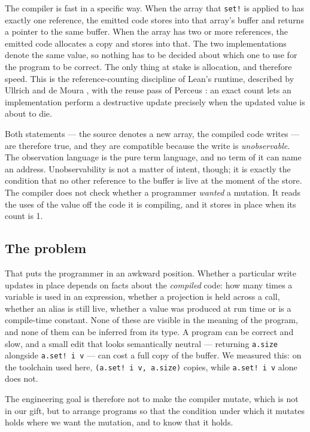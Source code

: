 \documentclass[11pt,a4paper]{article}
\theoremstyle{definition}
\theoremstyle{plain}
\newcommand{\code}[1]{\texttt{#1}}
\begin{document}
The compiler is fast in a specific way. When the array that \code{set!} is
applied to has exactly one reference, the emitted code stores into that array's
buffer and returns a pointer to the same buffer. When the array has two or more
references, the emitted code allocates a copy and stores into that. The two
implementations denote the same value, so nothing has to be decided about which
one to use for the program to be correct. The only thing at stake is allocation,
and therefore speed. This is the reference-counting discipline of Lean's
runtime, described by Ullrich and de Moura \cite{ullrich2019counting}, with the
reuse pass of Perceus \cite{reinking2021perceus}: an exact count lets an
implementation perform a destructive update precisely when the updated value is
about to die.

Both statements --- the source denotes a new array, the compiled code writes ---
are therefore true, and they are compatible because the write is
\emph{unobservable}. The observation language is the pure term language, and no
term of it can name an address. Unobservability is not a matter of intent,
though; it is exactly the condition that no other reference to the buffer is
live at the moment of the store. The compiler does not check whether a
programmer \emph{wanted} a mutation. It reads the uses of the value off the code
it is compiling, and it stores in place when its count is 1.

\subsection{The problem}

That puts the programmer in an awkward position. Whether a particular write
updates in place depends on facts about the \emph{compiled} code: how many times
a variable is used in an expression, whether a projection is held across a call,
whether an alias is still live, whether a value was produced at run time or is a
compile-time constant. None of these are visible in the meaning of the program,
and none of them can be inferred from its type. A program can be correct and
slow, and a small edit that looks semantically neutral --- returning
\code{a.size} alongside \code{a.set! i v} --- can cost a full copy of the buffer.
We measured this: on the toolchain used here, \code{(a.set! i v, a.size)} copies,
while \code{a.set! i v} alone does not.

The engineering goal is therefore not to make the compiler mutate, which is not
in our gift, but to arrange programs so that the condition under which it
mutates holds where we want the mutation, and to know that it holds.
\end{document}
